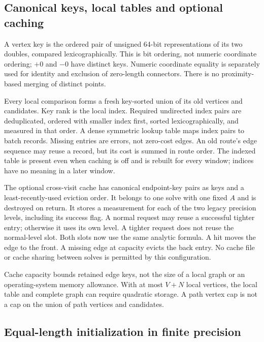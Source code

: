 \documentclass[11pt,letterpaper]{article}
\begin{document}
\subsection{Canonical keys, local tables and optional caching}
\label{sec:cpp-tables}

A vertex key is the ordered pair of unsigned 64-bit representations of its
two doubles, compared lexicographically. This is bit ordering, not numeric
coordinate ordering; $+0$ and $-0$ have distinct keys. Numeric coordinate
equality is separately used for identity and exclusion of zero-length
connectors. There is no proximity-based merging of distinct points.

Every local comparison forms a fresh key-sorted union of its old vertices
and candidates. Key rank is the local index. Required undirected index pairs
are deduplicated, ordered with smaller index first, sorted lexicographically,
and measured in that order. A dense symmetric lookup table maps index pairs
to batch records. Missing entries are errors, not zero-cost edges. An old
route's edge sequence may reuse a record, but its cost is summed in route
order. The indexed table is present even when caching is off and is rebuilt
for every window; indices have no meaning in a later window.

The optional cross-visit cache has canonical endpoint-key pairs as keys and
a least-recently-used eviction order. It belongs to one solve with one fixed
$A$ and is destroyed on return. It stores a measurement for each of the two
legacy precision levels, including its success flag. A normal request may
reuse a successful tighter entry; otherwise it uses its own level. A
tighter request does not reuse the normal-level slot. Both slots now use the
same analytic formula. A hit moves the edge to the front. A missing edge at
capacity evicts the back entry. No cache file or cache sharing between solves
is permitted by this configuration.

Cache capacity bounds retained edge keys, not the size of a local graph or
an operating-system memory allowance. With at most $V+N$ local vertices,
the local table and complete graph can require quadratic storage. A path
vertex cap is not a cap on the union of path vertices and candidates.

\subsection{Equal-length initialization in finite precision}
\label{sec:cpp-initialize}
\end{document}
